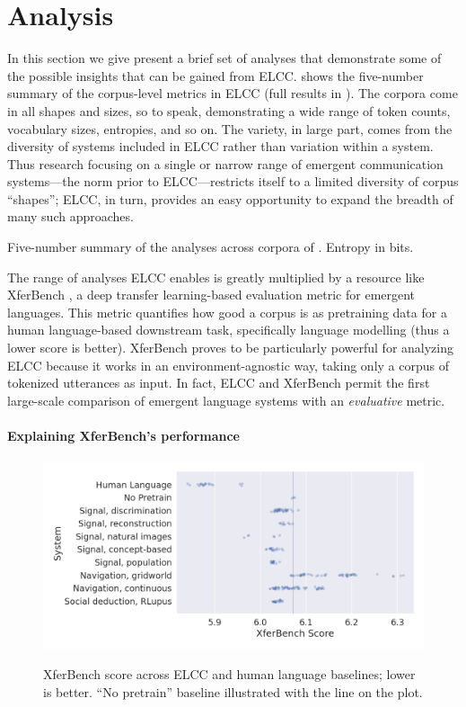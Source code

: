 \section{Analysis}
\unskip\label{elcc:sec:analysis}

In this section we give present a brief set of analyses that demonstrate some of the possible insights that can be gained from ELCC\@.
 shows the five-number summary of the corpus-level metrics in ELCC (full results in ).
The corpora come in all shapes and sizes, so to speak, demonstrating a wide range of token counts, vocabulary sizes, entropies, and so on.
The variety, in large part, comes from the diversity of systems included in ELCC rather than variation within a system.
Thus research focusing on a single or narrow range of emergent communication systems---the norm prior to ELCC---restricts itself to a limited diversity of corpus ``shapes''; ELCC, in turn, provides an easy opportunity to expand the breadth of many such approaches.

\begin{table}
  \centering
  \medskip
  \caption{Five-number summary of the analyses across corpora of \theLib{}.  Entropy in bits.}
  \unskip\label{tab:quant-sum}
\end{table}

The range of analyses ELCC enables is greatly multiplied by a resource like XferBench \citep{xferbench}, a deep transfer learning-based evaluation metric for emergent languages.
This metric quantifies how good a corpus is as pretraining data for a human language-based downstream task, specifically language modelling (thus a lower score is better).
XferBench proves to be particularly powerful for analyzing ELCC because it works in an environment-agnostic way, taking only a corpus of tokenized utterances as input.
In fact, ELCC and XferBench permit the first large-scale comparison of emergent language systems with an \emph{evaluative} metric.


\paragraph{Explaining XferBench's performance}

\begin{figure}
  \centering
  \includegraphics[width=0.7\linewidth]{chapters/elcc/src/figure/generated/elcc-cat}
  \caption{XferBench score across ELCC and human language baselines; lower is better.  ``No pretrain'' baseline illustrated with the line on the plot.}
  \unskip\label{elcc:fig:elcc-cat}
\end{figure}

